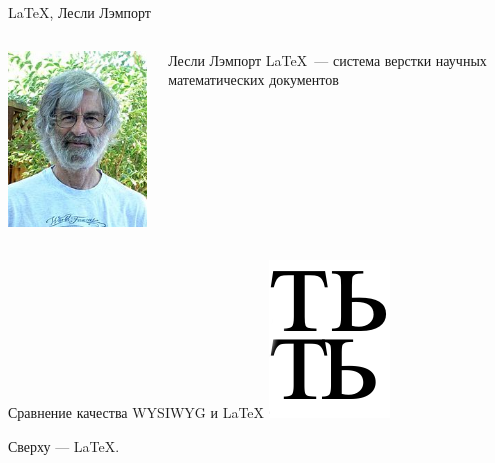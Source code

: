 \begin{frame}{\LaTeX, Лесли Лэмпорт}
    \begin{columns}
        \centering
        \includegraphics[width=1\linewidth]{../Figures/leslie.jpg}

        Лесли Лэмпорт
        \LaTeX~--- система верстки научных математических документов
    \end{columns}
\end{frame}

\begin{frame}{Сравнение качества WYSIWYG и \LaTeX}
    \centering
    \includegraphics[width=.3\linewidth]{../Figures/quality.png}

    Сверху --- \LaTeX.
\end{frame}

